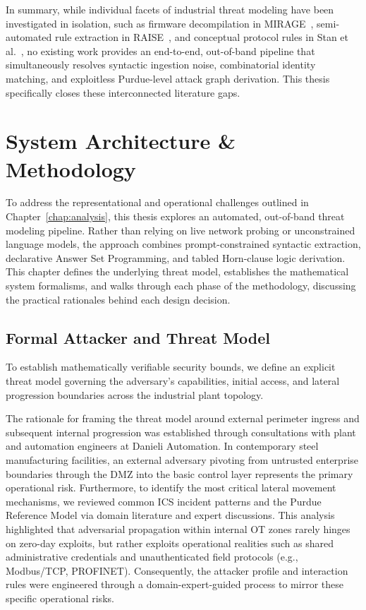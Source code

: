 \documentclass[target=mst,aauheader=aics,style=]{thud}
\begin{document}
In summary, while individual facets of industrial threat modeling have been investigated in isolation, such as firmware decompilation in MIRAGE~\cite{TayouriMIRAGE}, semi-automated rule extraction in RAISE~\cite{StevanovicWachterRAISE}, and conceptual protocol rules in Stan et al.~\cite{StanExtended}, no existing work provides an end-to-end, out-of-band pipeline that simultaneously resolves syntactic ingestion noise, combinatorial identity matching, and exploitless Purdue-level attack graph derivation. This thesis specifically closes these interconnected literature gaps.

\chapter{System Architecture \& Methodology}
\label{chap:architecture}

To address the representational and operational challenges outlined in Chapter~\ref{chap:analysis}, this thesis explores an automated, out-of-band threat modeling pipeline. Rather than relying on live network probing or unconstrained language models, the approach combines prompt-constrained syntactic extraction, declarative Answer Set Programming, and tabled Horn-clause logic derivation. This chapter defines the underlying threat model, establishes the mathematical system formalisms, and walks through each phase of the methodology, discussing the practical rationales behind each design decision.

\section{Formal Attacker and Threat Model}
\label{sec:threat_model}
To establish mathematically verifiable security bounds, we define an explicit threat model governing the adversary's capabilities, initial access, and lateral progression boundaries across the industrial plant topology. 

The rationale for framing the threat model around external perimeter ingress and subsequent internal progression was established through consultations with plant and automation engineers at Danieli Automation. In contemporary steel manufacturing facilities, an external adversary pivoting from untrusted enterprise boundaries through the DMZ into the basic control layer represents the primary operational risk. Furthermore, to identify the most critical lateral movement mechanisms, we reviewed common ICS incident patterns and the Purdue Reference Model via domain literature and expert discussions. This analysis highlighted that adversarial propagation within internal OT zones rarely hinges on zero-day exploits, but rather exploits operational realities such as shared administrative credentials and unauthenticated field protocols (e.g., Modbus/TCP, PROFINET). Consequently, the attacker profile and interaction rules were engineered through a domain-expert-guided process to mirror these specific operational risks.
\end{document}
